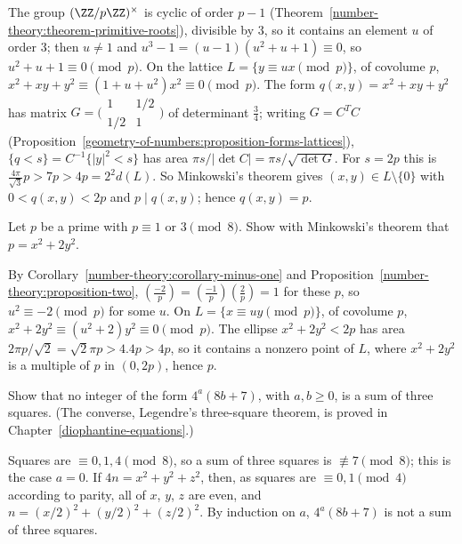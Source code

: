 \begin{solution}
The group $(\ZZ/p\ZZ)^\times$ is cyclic of order $p - 1$ (Theorem~\ref{number-theory:theorem-primitive-roots}), divisible by $3$, so it contains an element $u$ of order $3$; then $u \neq 1$ and
$u^3 - 1 = (u - 1)(u^2 + u + 1) \equiv 0$, so $u^2 + u + 1 \equiv 0 \pmod p$. On the lattice $L = \{y \equiv ux \pmod p\}$, of covolume $p$, $x^2 + xy + y^2 \equiv (1 + u + u^2)x^2 \equiv 0 \pmod p$. The form
$q(x, y) = x^2 + xy + y^2$ has matrix $G = \bigl(\begin{smallmatrix}1 & 1/2\\ 1/2 & 1\end{smallmatrix}\bigr)$ of determinant $\frac34$; writing $G = C^TC$ (Proposition~\ref{geometry-of-numbers:proposition-forms-lattices}),
$\{q < s\} = C^{-1}\{|y|^2 < s\}$ has area $\pi s/|\det C| = \pi s/\sqrt{\det G}$. For $s = 2p$ this is $\frac{4\pi}{\sqrt3}p > 7p > 4p = 2^2d(L)$. So Minkowski's theorem gives $(x, y) \in L \setminus \{0\}$ with
$0 < q(x, y) < 2p$ and $p \mid q(x, y)$; hence $q(x, y) = p$.
\end{solution}

\begin{exercise}\label{geometry-of-numbers:exercise-x2-2y2}
Let $p$ be a prime with $p \equiv 1$ or $3 \pmod 8$. Show with Minkowski's theorem that $p = x^2 + 2y^2$.
\end{exercise}

\begin{solution}
By Corollary~\ref{number-theory:corollary-minus-one} and Proposition~\ref{number-theory:proposition-two}, $(\frac{-2}{p}) = (\frac{-1}{p})(\frac2p) = 1$ for these $p$, so $u^2 \equiv -2 \pmod p$ for some $u$. On
$L = \{x \equiv uy \pmod p\}$, of covolume $p$, $x^2 + 2y^2 \equiv (u^2 + 2)y^2 \equiv 0 \pmod p$. The ellipse $x^2 + 2y^2 < 2p$ has area $2\pi p/\sqrt2 = \sqrt2\pi p > 4.4p > 4p$, so it contains a nonzero point of $L$,
where $x^2 + 2y^2$ is a multiple of $p$ in $(0, 2p)$, hence $p$.
\end{solution}

\begin{exercise}\label{geometry-of-numbers:exercise-three-squares-necessary}
Show that no integer of the form $4^a(8b + 7)$, with $a, b \geq 0$, is a sum of three squares. (The converse, Legendre's three-square theorem, is proved in Chapter~\ref{diophantine-equations}.)
\end{exercise}

\begin{solution}
Squares are $\equiv 0, 1, 4 \pmod 8$, so a sum of three squares is $\not\equiv 7 \pmod 8$; this is the case $a = 0$. If $4n = x^2 + y^2 + z^2$, then, as squares are $\equiv 0, 1 \pmod 4$ according to parity, all
of $x$, $y$, $z$ are even, and $n = (x/2)^2 + (y/2)^2 + (z/2)^2$. By induction on $a$, $4^a(8b + 7)$ is not a sum of three squares.
\end{solution}

